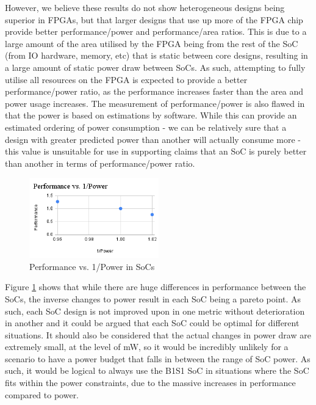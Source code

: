 However, we believe these results do not show heterogeneous designs being superior in FPGAs, but that larger designs that use up more of the FPGA chip provide better performance/power and performance/area ratios. This is due to a large amount of the area utilised by the FPGA being from the rest of the SoC (from IO hardware, memory, etc) that is static between core designs, resulting in a large amount of static power draw between SoCs. As such, attempting to fully utilise all resources on the FPGA is expected to provide a better performance/power ratio, as the performance increases faster than the area and power usage increases. The measurement of performance/power is also flawed in that the power is based on estimations by software. While this can provide an estimated ordering of power consumption - we can be relatively sure that a design with greater predicted power than another will actually consume more - this value is unsuitable for use in supporting claims that an SoC is purely better than another in terms of performance/power ratio.

\begin{figure}[h!]
    \centering
    \includegraphics[width=0.5\textwidth]{img/Performance vs. 1_Power.png}
    \caption{Performance vs. 1/Power in SoCs}
    \label{fig:perf_v_power}
\end{figure}

Figure \ref{fig:perf_v_power} shows that while there are huge differences in performance between the SoCs, the inverse changes to power result in each SoC being a pareto point. As such, each SoC design is not improved upon in one metric without deterioration in another and it could be argued that each SoC could be optimal for different situations. It should also be considered that the actual changes in power draw are extremely small, at the level of mW, so it would be incredibly unlikely for a scenario to have a power budget that falls in between the range of SoC power. As such, it would be logical to always use the B1S1 SoC in situations where the SoC fits within the power constraints, due to the massive increases in performance compared to power.

